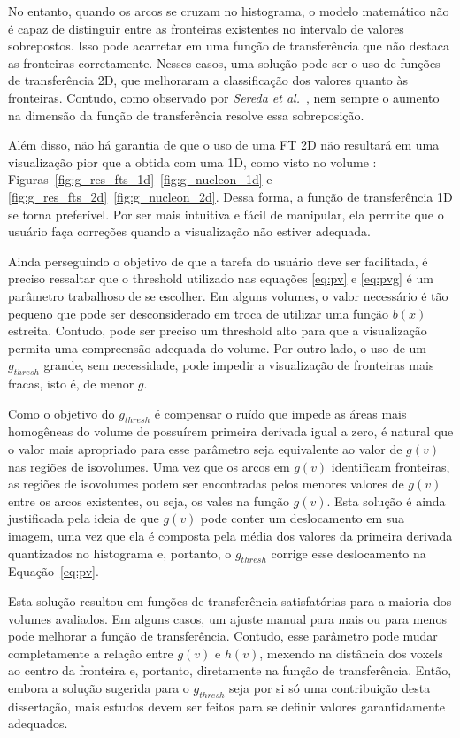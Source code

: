 	No entanto, quando os arcos se cruzam no histograma, o modelo matemático não é capaz de distinguir entre as fronteiras existentes no intervalo de valores sobrepostos. Isso pode acarretar em uma função de transferência que não destaca as fronteiras corretamente. Nesses casos, uma solução pode ser o uso de funções de transferência 2D, que melhoraram a classificação dos valores quanto às fronteiras. Contudo, como observado por \textit{Sereda et al.}~\cite{sereda1}, nem sempre o aumento na dimensão da função de transferência resolve essa sobreposição.
	
	Além disso, não há garantia de que o uso de uma FT 2D não resultará em uma visualização pior que a obtida com uma 1D, como visto no volume : Figuras~\ref{fig:g_res_fts_1d}~\ref{fig:g_nucleon_1d} e \ref{fig:g_res_fts_2d}~\ref{fig:g_nucleon_2d}. Dessa forma, a função de transferência 1D se torna preferível. Por ser mais intuitiva e fácil de manipular, ela permite que o usuário faça correções quando a visualização não estiver adequada.
	
	Ainda perseguindo o objetivo de que a tarefa do usuário deve ser facilitada, é preciso ressaltar que o threshold utilizado nas equações \eqref{eq:pv} e \eqref{eq:pvg} é um parâmetro trabalhoso de se escolher. Em alguns volumes, o valor necessário é tão pequeno que pode ser desconsiderado em troca de utilizar uma função $ b(x) $ estreita. Contudo, pode ser preciso um threshold alto para que a visualização permita uma compreensão adequada do volume.	Por outro lado, o uso de um $ g_{thresh} $ grande, sem necessidade, pode impedir a visualização de fronteiras mais fracas, isto é, de menor $ g $.
	
	Como o objetivo do $ g_{thresh} $ é compensar o ruído que impede as áreas mais homogêneas do volume de possuírem primeira derivada igual a zero, é natural que o valor mais apropriado para esse parâmetro seja equivalente ao valor de $ g(v) $ nas regiões de isovolumes. Uma vez que os arcos em $ g(v) $ identificam fronteiras, as regiões de isovolumes podem ser encontradas pelos menores valores de $ g(v) $ entre os arcos existentes, ou seja, os vales na função $ g(v) $. Esta solução é ainda justificada pela ideia de que $ g(v) $ pode conter um deslocamento em sua imagem, uma vez que ela é composta pela média dos valores da primeira derivada quantizados no histograma e, portanto, o $ g_{thresh} $ corrige esse deslocamento na Equação~\eqref{eq:pv}.
	
	Esta solução resultou em funções de transferência satisfatórias para a maioria dos volumes avaliados. Em alguns casos, um ajuste manual para mais ou para menos pode melhorar a função de transferência. Contudo, esse parâmetro pode mudar completamente a relação entre $ g(v) $ e $ h(v) $, mexendo na distância dos voxels ao centro da fronteira e, portanto, diretamente na função de transferência. Então, embora a solução sugerida para o $ g_{thresh} $ seja por si só uma contribuição desta dissertação, mais estudos devem ser feitos para se definir valores garantidamente adequados.
	
